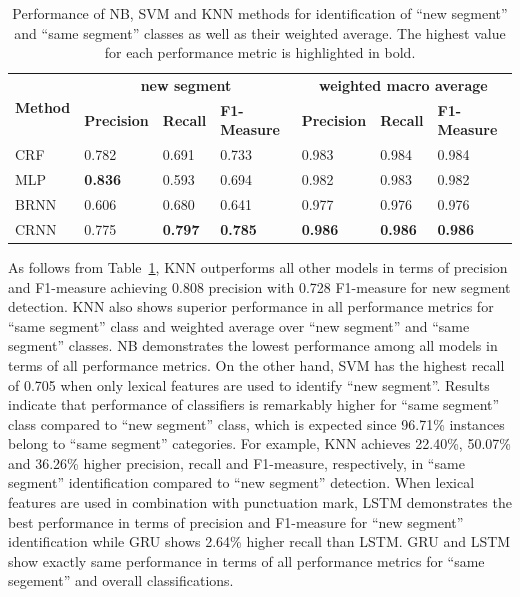 \documentclass{amia}
\begin{document}
\begin{table}[ht]
\centering
\caption{Performance of NB, SVM and KNN methods for identification of ``new segment'' and ``same segment'' classes as well as their weighted average. The highest value for each performance metric is highlighted in bold.}
\label{tab:result_base}
  \begin{tabular}{|l|l|l|l|l|l|l|}
  \hline
   \multirow{2}{*}{\textbf{Method}} & \multicolumn{3}{|c|}{\textbf{new segment}} & \multicolumn{3}{|c|}{\textbf{weighted macro average}} \\\cline{2-7}
   & \textbf{Precision}  & \textbf{Recall} & \textbf{F1-Measure} & \textbf{Precision}  & \textbf{Recall} & \textbf{F1-Measure} \\ \hline    
 CRF & 0.782 & 0.691 & 0.733 & 0.983 & 0.984 & 0.984 \\ \hline
 MLP & \textbf{0.836} & 0.593 & 0.694 & 0.982 & 0.983 & 0.982 \\ \hline
 BRNN & 0.606 & 0.680 & 0.641 & 0.977 & 0.976 & 0.976 \\ \hline
 CRNN & 0.775 & \textbf{0.797} & \textbf{0.785} & \textbf{0.986} & \textbf{0.986} & \textbf{0.986} \\ \hline
  \end{tabular}
\end{table}                         

As follows from Table~\ref{tab:result_base}, KNN outperforms all other models in terms of precision and F1-measure achieving 0.808 precision with 0.728 F1-measure for new segment detection. KNN also shows superior performance in all performance metrics for ``same segment'' class and weighted average over ``new segment'' and ``same segment'' classes. NB demonstrates the lowest performance among all models in terms of all performance metrics. On the other hand, SVM has the highest recall of 0.705 when only lexical features are used to identify ``new segment''. Results indicate that performance of classifiers is remarkably higher for ``same segment'' class compared to ``new segment'' class, which is expected since 96.71\% instances belong to ``same segment'' categories. For example, KNN achieves 22.40\%, 50.07\% and 36.26\% higher precision, recall and F1-measure, respectively, in ``same segment'' identification compared to ``new segment'' detection. When lexical features are used in combination with punctuation mark, LSTM demonstrates the best performance in terms of precision and F1-measure for ``new segment'' identification while GRU shows 2.64\% higher recall than LSTM. GRU and LSTM show exactly same performance in terms of all performance metrics for ``same segement'' and overall classifications. \\  
\end{document}
